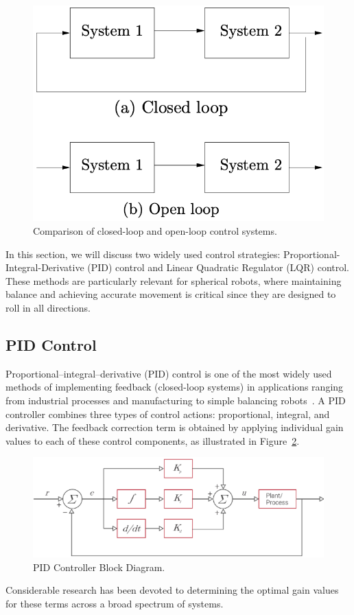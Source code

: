 \documentclass[english, bachelor, utf8]{base/thesis_telematics}
\begin{document}
\begin{figure}[ht]
\centering
\includegraphics[width=0.4\columnwidth]{pics/systems.png}
\caption{Comparison of closed-loop and open-loop control systems.\cite{feedbackBook}}
\label{fig:control_systems}
\end{figure}

In this section, we will discuss two widely used control strategies: Proportional-Integral-Derivative (PID) control and Linear Quadratic Regulator (LQR) control.
These methods are particularly relevant for spherical robots, where maintaining balance and achieving accurate movement is critical since they are designed to roll in all directions.
\subsection{PID Control}
Proportional–integral–derivative (PID) control is one of the most widely used methods of implementing feedback (closed-loop systems) in applications ranging from industrial processes and manufacturing to simple balancing robots~\cite{feedbackBook}. 
A PID controller combines three types of control actions: proportional, integral, and derivative. The feedback correction term is obtained by applying individual gain values to each of these control components, as illustrated in Figure~\ref{fig:pid_control}.
\begin{figure}[ht]
\centering
\includegraphics[width=0.7\columnwidth]{pics/pid_control.png}
\caption{PID Controller Block Diagram.~\cite{vectornav_math_controls}}
\label{fig:pid_control}
\end{figure}

Considerable research has been devoted to determining the optimal gain values for these terms across a broad spectrum of systems.
\end{document}
